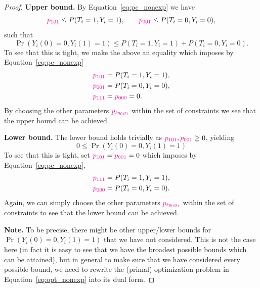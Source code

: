 \documentclass[11pt]{exam}
\begin{document}
\begin{proof}
\noindent
    \textbf{Upper bound.}
    By Equation~\eqref{eq:pc_nonexp} we have
    \[
    \textcolor{magenta}{p_{1 0 1}} \leq P(T_i = 1, Y_i = 1), \qquad \textcolor{magenta}{p_{0 0 1}} \leq P(T_i = 0, Y_i = 0),
    \]
    such that
    \[
        \Pr(Y_i(0) = 0, Y_i(1) = 1) \leq P(T_i = 1, Y_i = 1) + P(T_i = 0, Y_i = 0).
    \]
    To see that this is tight, we make the above an equality which imposes by Equation~\ref{eq:pc_nonexp}
    \begin{align*}
        \textcolor{magenta}{p_{1 0 1}} &= P(T_i = 1, Y_i = 1),
        \\
        \textcolor{magenta}{p_{0 0 1}} &= P(T_i = 0, Y_i = 0),
        \\
        \textcolor{magenta}{p_{1 1 1}} &= \textcolor{magenta}{p_{0 0 0}} = 0.
    \end{align*}
    By choosing the other parameters $\textcolor{magenta}{p_{t y_0 y_1}}$ within the set of constraints we see that the upper bound can be achieved.
    
    \textbf{Lower bound.}
    The lower bound holds trivially as $\textcolor{magenta}{p_{1 0 1}}, \textcolor{magenta}{p_{0 0 1}} \geq 0$, yielding
    \[
    0 \leq \Pr(Y_i(0) = 0, Y_i(1) = 1)
    \]
    To see that this is tight, set $\textcolor{magenta}{p_{1 0 1}} = \textcolor{magenta}{p_{0 0 1}} = 0$ which imposes by Equation~\ref{eq:pc_nonexp},
    \begin{align*}
        \textcolor{magenta}{p_{1 1 1}} &= P(T_i = 1, Y_i = 1),
        \\
        \textcolor{magenta}{p_{0 0 0}} &= P(T_i = 0, Y_i = 0).
    \end{align*}
    Again, we can simply choose the other parameters $\textcolor{magenta}{p_{t y_0 y_1}}$ within the set of constraints to see that the lower bound can be achieved.

    \textbf{Note.} To be precise, there might be other upper/lower bounds for $\Pr(Y_i(0) = 0, Y_i(1) = 1)$ that we have not considered. This is not the case here (in fact it is easy to see that we have the broadest possible bounds which can be attained), but in general to make sure that we have considered every possible bound, we need to rewrite the (primal) optimization problem in Equation~\eqref{eq:opt_nonexp} into its dual form. 
\end{proof}
\end{document}
